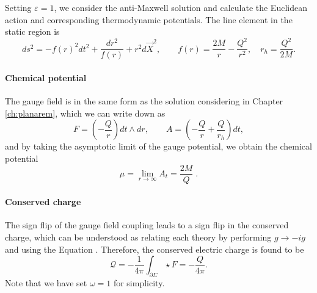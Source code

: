 Setting $\varepsilon=1$, we consider the anti-Maxwell solution and calculate the Euclidean action and corresponding thermodynamic potentials. The line element in the static region is
\begin{equation}
\label{eq:planarantiem}
    ds^2 = -f(r)^2 dt^2 + \frac{dr^2}{f(r)} + r^2 d\vec{X}^2, \qquad f(r) = \frac{2M}{r} - \frac{Q^2}{r^2}, \quad r_h = \frac{Q^2}{2M}.
\end{equation}

\paragraph{Chemical potential}

The gauge field is in the same form as the solution considering in Chapter \ref{ch:planarem}, which we can write down as
\begin{equation}
    F = \left( - \frac{Q}{r} \right) dt \wedge dr, \qquad  A = \left(- \frac{Q}{r} + \frac{Q}{r_h} \right) dt,
\end{equation}
and by taking the asymptotic limit of the gauge potential, we obtain the chemical potential 
\begin{equation*}
    \mu = \lim_{r \rightarrow \infty} A_t = \frac{2M}{Q} \;.
\end{equation*}

\paragraph{Conserved charge}

The sign flip of the gauge field coupling leads to a sign flip in the conserved charge, which can be understood as relating each theory by performing $g \rightarrow -ig$ and using the Equation . Therefore, the conserved electric charge is found to be 
\begin{equation*}
    \mathcal{Q} = -\frac{1}{4 \pi} \int_{\partial \Sigma} \star F = - \frac{Q}{4 \pi}.
\end{equation*}
Note that we have set $\omega=1$ for simplicity. 

